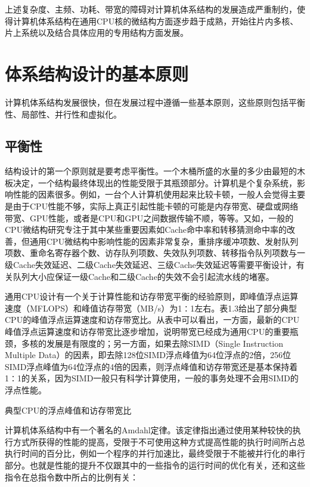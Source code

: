 \documentclass[]{ctexbook}
\begin{document}
上述复杂度、主频、功耗、带宽的障碍对计算机体系结构的发展造成严重制约，使得计算机体系结构在通用CPU核的微结构方面逐步趋于成熟，开始往片内多核、片上系统以及结合具体应用的专用结构方面发展。

\hypertarget{ux4f53ux7cfbux7ed3ux6784ux8bbeux8ba1ux7684ux57faux672cux539fux5219}{%
\section{体系结构设计的基本原则}\label{ux4f53ux7cfbux7ed3ux6784ux8bbeux8ba1ux7684ux57faux672cux539fux5219}}

计算机体系结构发展很快，但在发展过程中遵循一些基本原则，这些原则包括平衡性、局部性、并行性和虚拟化。

\hypertarget{ux5e73ux8861ux6027}{%
\subsection{平衡性}\label{ux5e73ux8861ux6027}}

结构设计的第一个原则就是要考虑平衡性。一个木桶所盛的水量的多少由最短的木板决定，一个结构最终体现出的性能受限于其瓶颈部分。计算机是个复杂系统，影响性能的因素很多。例如，一台个人计算机使用起来比较卡顿，一般人会觉得主要是由于CPU性能不够，实际上真正引起性能卡顿的可能是内存带宽、硬盘或网络带宽、GPU性能，或者是CPU和GPU之间数据传输不顺，等等。又如，一般的CPU微结构研究专注于其中某些重要因素如Cache命中率和转移猜测命中率的改善，但通用CPU微结构中影响性能的因素非常复杂，重排序缓冲项数、发射队列项数、重命名寄存器个数、访存队列项数、失效队列项数、转移指令队列项数与一级Cache失效延迟、二级Cache失效延迟、三级Cache失效延迟等需要平衡设计，有关队列大小应保证一级Cache和二级Cache的失效不会引起流水线的堵塞。

通用CPU设计有一个关于计算性能和访存带宽平衡的经验原则，即峰值浮点运算速度（MFLOPS）和峰值访存带宽（MB/s）为1∶1左右。表1.3给出了部分典型CPU的峰值浮点运算速度和访存带宽比。从表中可以看出，一方面，最新的CPU峰值浮点运算速度和访存带宽比逐步增加，说明带宽已经成为通用CPU的重要瓶颈，多核的发展是有限度的；另一方面，如果去除SIMD（Single Instruction Multiple Data）的因素，即去除128位SIMD浮点峰值为64位浮点的2倍，256位SIMD浮点峰值为64位浮点的4倍的因素，则浮点峰值和访存带宽还是基本保持着1∶1的关系，因为SIMD一般只有科学计算使用，一般的事务处理不会用SIMD的浮点性能。

\label{tab:flops-and-bandwidth}典型CPU的浮点峰值和访存带宽比

计算机体系结构中有一个著名的Amdahl定律。该定律指出通过使用某种较快的执行方式所获得的性能的提高，受限于不可使用这种方式提高性能的执行时间所占总执行时间的百分比，例如一个程序的并行加速比，最终受限于不能被并行化的串行部分。也就是性能的提升不仅跟其中的一些指令的运行时间的优化有关，还和这些指令在总指令数中所占的比例有关：
\end{document}
